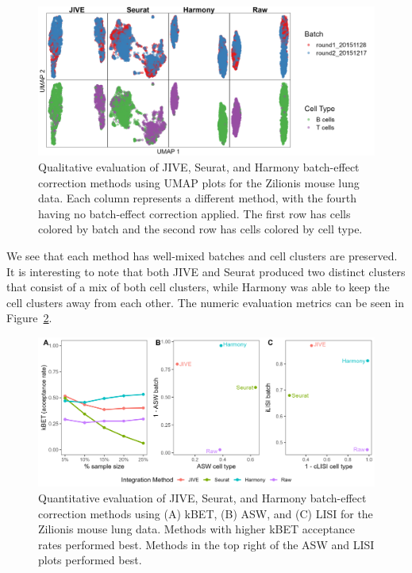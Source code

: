 \documentclass[unnumsec,webpdf,contemporary,large]{oup-authoring-template}%
\theoremstyle{thmstyleone}%
\theoremstyle{thmstyletwo}%
\theoremstyle{thmstylethree}%
\begin{document}
\begin{figure}[ht]
    \centering 
    \includegraphics[width=1\columnwidth]{umap_zilionisdata} 
    \caption[UMAP Plots for the Zilionis Mouse Lung Data]{Qualitative evaluation of JIVE, Seurat, and Harmony batch-effect correction methods using UMAP plots for the Zilionis mouse lung data. Each column represents a different method, with the fourth having no batch-effect correction applied. The first row has cells colored by batch and the second row has cells colored by cell type.}
    \label{fig:umap_zilionisdata} 
\end{figure}

We see that each method has well-mixed batches and cell clusters are preserved. It is interesting to note that both JIVE and Seurat produced two distinct clusters that consist of a mix of both cell clusters, while Harmony was able to keep the cell clusters away from each other. The numeric evaluation metrics can be seen in Figure~\ref{fig:metrics_zilionisdata}.

\begin{figure}[ht]
    \centering 
    \includegraphics[width=1\columnwidth]{metrics_zilionisdata} 
    \caption[Metrics for the Zilionis Mouse Lung Data]{Quantitative evaluation of JIVE, Seurat, and Harmony batch-effect correction methods using (A) kBET, (B) ASW, and (C) LISI for the Zilionis mouse lung data. Methods with higher kBET acceptance rates performed best. Methods in the top right of the ASW and LISI plots performed best.}
    \label{fig:metrics_zilionisdata} 
\end{figure}
\end{document}
